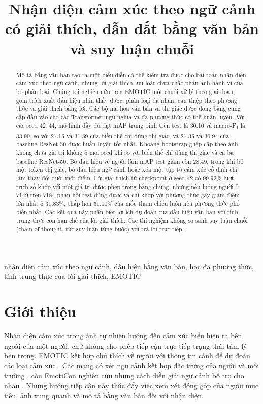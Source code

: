 \documentclass[conference]{IEEEtran}
\newcommand{\mf}{macro-F\textsubscript{1}}
\begin{document}
\title{Nhận diện cảm xúc theo ngữ cảnh có giải thích, dẫn dắt bằng văn bản và suy luận chuỗi}
\author{
}
\maketitle

\begin{abstract}
Mô tả bằng văn bản tạo ra một biểu diễn có thể kiểm tra được cho bài toán nhận diện cảm xúc theo ngữ cảnh, nhưng lời giải thích lưu loát chưa chắc phản ánh hành vi của bộ phân loại. Chúng tôi nghiên cứu trên EMOTIC một chuỗi xử lý theo giai đoạn, gồm trích xuất dấu hiệu nhìn thấy được, phân loại đa nhãn, can thiệp theo phương thức và giải thích bằng lời. Các bộ mã hóa văn bản và thị giác được đóng băng cung cấp đầu vào cho các Transformer ngữ nghĩa và đa phương thức có thể huấn luyện. Với các seed 42--44, mô hình đầy đủ đạt mAP trung bình trên test là 30.10 và \mf{} là 33.90, so với 27.15 và 31.59 của biến thể chỉ dùng thị giác, và 27.35 và 30.94 của baseline ResNet-50 được huấn luyện tốt nhất. Khoảng bootstrap ghép cặp theo ảnh không chứa giá trị không ở mọi seed khi so với biến thể chỉ dùng thị giác và cả ba baseline ResNet-50. Bỏ dấu hiệu về người làm mAP test giảm còn 28.49, trong khi bỏ một token thị giác, bỏ dấu hiệu ngữ cảnh hoặc xóa một tập từ cảm xúc cố định chỉ làm thay đổi dưới một điểm. Lời giải thích từ checkpoint ở seed 42 có 99.92\% lượt trích số khớp với một giá trị được phép trong bằng chứng, nhưng nêu luồng người ở 7149 trên 7184 phản hồi test dùng được và chỉ khớp với phương thức gây giảm điểm lớn nhất ở 31.83\%, thấp hơn 51.00\% của mốc tham chiếu luôn nêu phương thức phổ biến nhất. Các kết quả này phân biệt lợi ích dự đoán của dấu hiệu văn bản với tính trung thực còn hạn chế của lời giải thích. Các thí nghiệm không so sánh suy luận chuỗi (chain-of-thought, tức suy luận từng bước) với trả lời trực tiếp.
\end{abstract}
\begin{IEEEkeywords}
nhận diện cảm xúc theo ngữ cảnh, dấu hiệu bằng văn bản, học đa phương thức, tính trung thực của lời giải thích, EMOTIC
\end{IEEEkeywords}

\section{Giới thiệu}\label{sec:introduction}
Nhận diện cảm xúc trong ảnh tự nhiên hướng đến cảm xúc biểu hiện ra bên ngoài của một người, chứ không cho phép tiếp cận trực tiếp trạng thái tâm lý bên trong. EMOTIC kết hợp chú thích về người với thông tin cảnh để dự đoán các loại cảm xúc \cite{emotic}. Các mạng có xét ngữ cảnh kết hợp đặc trưng của người và môi trường \cite{caer}, còn EmotiCon nghiên cứu những cách diễn giải ngữ cảnh bổ trợ cho nhau \cite{emoticon}. Những hướng tiếp cận này thúc đẩy việc xem xét đóng góp của người mục tiêu, ảnh xung quanh và mô tả bằng văn bản đối với nhận diện.
\end{document}
